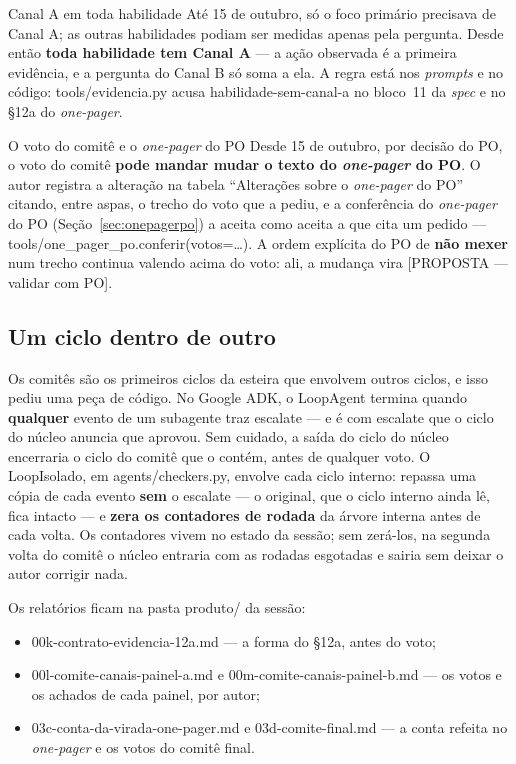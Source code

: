 \documentclass[11pt,a4paper]{article}
\newcommand{\cod}[1]{{\ttfamily\small #1}}
\begin{document}
\begin{caixaNorma}{Canal A em toda habilidade}
Até 15 de outubro, só o foco primário precisava de Canal A; as outras habilidades podiam ser medidas apenas pela pergunta. Desde então \textbf{toda habilidade tem Canal A} --- a ação observada é a primeira evidência, e a pergunta do Canal B só soma a ela. A regra está nos \emph{prompts} e no código: \cod{tools/evidencia.py} acusa \cod{habilidade-sem-canal-a} no bloco~11 da \emph{spec} e no \S12a do \emph{one-pager}.
\end{caixaNorma}

\begin{caixaNorma}{O voto do comitê e o \emph{one-pager} do PO}
Desde 15 de outubro, por decisão do PO, o voto do comitê \textbf{pode mandar mudar o texto do \emph{one-pager} do PO}. O autor registra a alteração na tabela ``Alterações sobre o \emph{one-pager} do PO'' citando, entre aspas, o trecho do voto que a pediu, e a conferência do \emph{one-pager} do PO (Seção~\ref{sec:onepagerpo}) a aceita como aceita a que cita um pedido --- \cod{tools/one\_pager\_po.conferir(votos=\ldots)}. A ordem explícita do PO de \textbf{não mexer} num trecho continua valendo acima do voto: ali, a mudança vira \cod{[PROPOSTA — validar com PO]}.
\end{caixaNorma}

\subsection{Um ciclo dentro de outro}

Os comitês são os primeiros ciclos da esteira que envolvem outros ciclos, e isso pediu uma peça de código. No Google ADK, o \cod{LoopAgent} termina quando \textbf{qualquer} evento de um subagente traz \cod{escalate} --- e é com \cod{escalate} que o ciclo do núcleo anuncia que aprovou. Sem cuidado, a saída do ciclo do núcleo encerraria o ciclo do comitê que o contém, antes de qualquer voto. O \cod{LoopIsolado}, em \cod{agents/\allowbreak checkers.py}, envolve cada ciclo interno: repassa uma cópia de cada evento \textbf{sem} o \cod{escalate} --- o original, que o ciclo interno ainda lê, fica intacto --- e \textbf{zera os contadores de rodada} da árvore interna antes de cada volta. Os contadores vivem no estado da sessão; sem zerá-los, na segunda volta do comitê o núcleo entraria com as rodadas esgotadas e sairia sem deixar o autor corrigir nada.

Os relatórios ficam na pasta \cod{produto/} da sessão:
\begin{itemize}
  \item \cod{00k-contrato-evidencia-12a.md} --- a forma do \S12a, antes do voto;
  \item \cod{00l-comite-canais-painel-a.md} e \cod{00m-comite-canais-painel-b.md} --- os votos e os achados de cada painel, por autor;
  \item \cod{03c-conta-da-virada-one-pager.md} e \cod{03d-comite-final.md} --- a conta refeita no \emph{one-pager} e os votos do comitê final.
\end{itemize}
\end{document}

